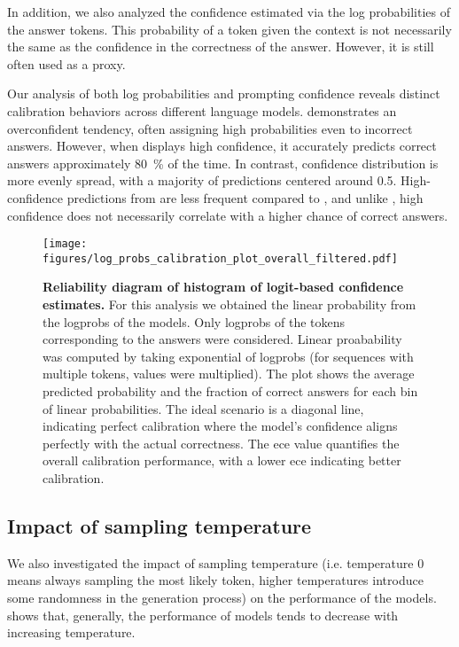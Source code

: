 In addition, we also analyzed the confidence estimated via the log probabilities of the answer tokens. This probability of a token given the context is not necessarily the same as the confidence in the correctness of the answer. However, it is still often used as a proxy.

Our analysis of both log probabilities and prompting confidence reveals distinct calibration behaviors across different language models.
\GPTFourO demonstrates an overconfident tendency, often assigning high probabilities even to incorrect answers.
However, when \GPTFourO displays high confidence, it accurately predicts correct answers approximately \SI{80}{\percent} of the time. In contrast, \LlamaThreeOneEightBInstruct confidence distribution is more evenly spread, with a majority of predictions centered around 0.5. High-confidence predictions from \LlamaThreeOneEightBInstruct are less frequent compared to \GPTFourO, and unlike \GPTFourO, high confidence does not necessarily correlate with a higher chance of correct answers.

\begin{figure}[htb]
    \centering
    \texttt{[image: figures/log\_probs\_calibration\_plot\_overall\_filtered.pdf]}
    \caption{\textbf{Reliability diagram of histogram of logit-based confidence estimates.} For this analysis we obtained the linear probability from the logprobs of the models. Only logprobs of the tokens corresponding to the answers were considered. Linear proabability was computed by taking exponential of logprobs (for sequences with multiple tokens, values were multiplied).  The plot shows the average predicted probability and the fraction of correct answers for each bin of linear probabilities. The ideal scenario is a diagonal line, indicating perfect calibration where the model's confidence aligns perfectly with the actual correctness. The \gls{ece} value quantifies the overall calibration performance, with a lower \gls{ece} indicating better calibration.}
    \label{fig:confidence_score_distributions}
\end{figure}

\clearpage
\subsection{Impact of sampling temperature}
We also investigated the impact of sampling temperature (i.e. temperature 0 means always sampling the most likely token, higher temperatures introduce some randomness in the generation process) on the performance of the models.  shows that, generally, the performance of models tends to decrease with increasing temperature.

